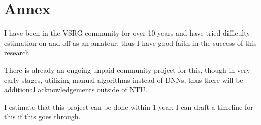 \section*{Annex}

I have been in the VSRG community for over 10 years and have tried difficulty estimation on-and-off as an amateur,
thus I have good faith in the success of this research.

There is already an ongoing unpaid community project for this, though in very early stages, utilizing manual algorithms instead of DNNs,
thus there will be additional acknowledgements outside of NTU.

I estimate that this project can be done within 1 year.
I can draft a timeline for this if this goes through.
